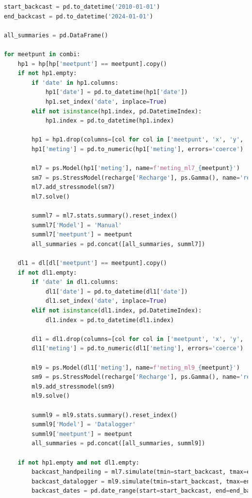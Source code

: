 \begin{lstlisting}[language=Python]
start_backcast = pd.to_datetime('2010-01-01')
end_backcast = pd.to_datetime('2024-01-01')

all_summaries = pd.DataFrame()

for meetpunt in combi:
    hp1 = hp[hp['meetpunt'] == meetpunt].copy()
    if not hp1.empty:
        if 'date' in hp1.columns:
            hp1['date'] = pd.to_datetime(hp1['date'])
            hp1.set_index('date', inplace=True)
        elif not isinstance(hp1.index, pd.DatetimeIndex):
            hp1.index = pd.to_datetime(hp1.index)
        
        hp1 = hp1.drop(columns=[col for col in ['meetpunt', 'x', 'y', 'ID', 'meethoogte'] if col in hp1.columns])
        hp1['meting'] = pd.to_numeric(hp1['meting'], errors='coerce')
        
        ml7 = ps.Model(hp1['meting'], name=f'meting_ml7_{meetpunt}')
        sm7 = ps.StressModel(recharge['Recharge'], ps.Gamma(), name='recharge', settings='evap')
        ml7.add_stressmodel(sm7)
        ml7.solve()
        
        summl7 = ml7.stats.summary().reset_index()
        summl7['Model'] = 'Manual'
        summl7['meetpunt'] = meetpunt
        all_summaries = pd.concat([all_summaries, summl7])
    
    dl1 = dl[dl['meetpunt'] == meetpunt].copy()
    if not dl1.empty:
        if 'date' in dl1.columns:
            dl1['date'] = pd.to_datetime(dl1['date'])
            dl1.set_index('date', inplace=True)
        elif not isinstance(dl1.index, pd.DatetimeIndex):
            dl1.index = pd.to_datetime(dl1.index)
        
        dl1 = dl1.drop(columns=[col for col in ['meetpunt', 'x', 'y', 'ID', 'meethoogte'] if col in dl1.columns])
        dl1['meting'] = pd.to_numeric(dl1['meting'], errors='coerce')
        
        ml9 = ps.Model(dl1['meting'], name=f'meting_ml9_{meetpunt}')
        sm9 = ps.StressModel(recharge['Recharge'], ps.Gamma(), name='recharge', settings='evap')
        ml9.add_stressmodel(sm9)
        ml9.solve()
        
        summl9 = ml9.stats.summary().reset_index()
        summl9['Model'] = 'Datalogger'
        summl9['meetpunt'] = meetpunt
        all_summaries = pd.concat([all_summaries, summl9])

    if not hp1.empty and not dl1.empty:
        backcast_handpeiling = ml7.simulate(tmin=start_backcast, tmax=end_backcast)
        backcast_datalogger = ml9.simulate(tmin=start_backcast, tmax=end_backcast)
        backcast_dates = pd.date_range(start=start_backcast, end=end_backcast, freq='D')
        

\end{lstlisting}
